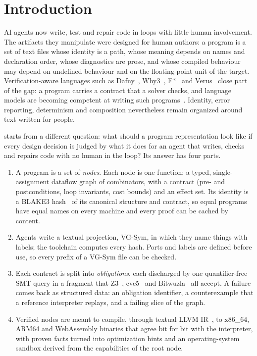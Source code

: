 \section{Introduction}\label{sec:intro}

AI agents now write, test and repair code in loops with little human involvement. The
artifacts they manipulate were designed for human authors: a program is a set of text files
whose identity is a path, whose meaning depends on names and declaration order, whose
diagnostics are prose, and whose compiled behaviour may depend on undefined behaviour and on
the floating-point unit of the target. Verification-aware languages such as
Dafny~\cite{leino2010dafny}, Why3~\cite{filliatre2013why3}, F*~\cite{swamy2016fstar} and
Verus~\cite{lattuada2023verus} close part of the gap: a program carries a contract that a
solver checks, and language models are becoming competent at writing such
programs~\cite{bursuc2025vericoding}. Identity, error reporting, determinism and composition
nevertheless remain organized around text written for people.

\VG{} starts from a different question: what should a program representation look like if
every design decision is judged by what it does for an agent that writes, checks and repairs
code with no human in the loop? Its answer has four parts.
\begin{enumerate}
\item A program is a set of \emph{nodes}. Each node is one function: a typed,
  single-assignment dataflow graph of combinators, with a contract (pre- and postconditions,
  loop invariants, cost bounds) and an effect set. Its identity is a BLAKE3
  hash~\cite{blake3} of its canonical structure and contract, so equal programs have equal
  names on every machine and every proof can be cached by content.
\item Agents write a textual projection, VG-Sym, in which they name things with labels; the
  toolchain computes every hash. Ports and labels are defined before use, so every prefix of
  a VG-Sym file can be checked.
\item Each contract is split into \emph{obligations}, each discharged by one quantifier-free
  SMT query in a fragment that Z3~\cite{demoura2008z3}, cvc5~\cite{barbosa2022cvc5} and
  Bitwuzla~\cite{niemetz2023bitwuzla} all accept. A failure comes back as structured data: an
  obligation identifier, a counterexample that a reference interpreter replays, and a failing
  slice of the graph.
\item Verified nodes are meant to compile, through textual LLVM IR~\cite{lattner2004llvm}, to
  x86\_64, ARM64 and WebAssembly binaries that agree bit for bit with the interpreter, with
  proven facts turned into optimization hints and an operating-system sandbox derived from the
  capabilities of the root node.
\end{enumerate}


